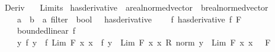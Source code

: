 %
\begin{isabellebody}%
%
%
\isadelimdocument
%
\endisadelimdocument
%
\isatagdocument
%
\isamarkuptrue%
%
\endisatagdocument
{\isafolddocument}%
%
\isadelimdocument
%
\endisadelimdocument
%
\isadelimtheory
%
\endisadelimtheory
%
\isatagtheory
{}\isamarkupfalse%
\ Deriv\isanewline
\ \ \ Limits\isanewline
{}%
\endisatagtheory
{\isafoldtheory}%
%
\isadelimtheory
%
\endisadelimtheory
%
\isadelimdocument
%
\endisadelimdocument
%
\isatagdocument
%
\isamarkuptrue%
%
\endisatagdocument
{\isafolddocument}%
%
\isadelimdocument
%
\endisadelimdocument
{}\isamarkupfalse%
\ has{\isacharunderscore}{\kern0pt}derivative\ {\isacharcolon}{\kern0pt}{\isacharcolon}{\kern0pt}\ {\isachardoublequoteopen}{\isacharparenleft}{\kern0pt}{\isacharprime}{\kern0pt}a{\isacharcolon}{\kern0pt}{\isacharcolon}{\kern0pt}real{\isacharunderscore}{\kern0pt}normed{\isacharunderscore}{\kern0pt}vector\ {\isasymRightarrow}\ {\isacharprime}{\kern0pt}b{\isacharcolon}{\kern0pt}{\isacharcolon}{\kern0pt}real{\isacharunderscore}{\kern0pt}normed{\isacharunderscore}{\kern0pt}vector{\isacharparenright}{\kern0pt}\ {\isasymRightarrow}\isanewline
\ \ \ \ {\isacharparenleft}{\kern0pt}{\isacharprime}{\kern0pt}a\ {\isasymRightarrow}\ {\isacharprime}{\kern0pt}b{\isacharparenright}{\kern0pt}\ {\isasymRightarrow}\ {\isacharprime}{\kern0pt}a\ filter\ {\isasymRightarrow}\ bool{\isachardoublequoteclose}\ \ {\isacharparenleft}{\kern0pt}\ {\isachardoublequoteopen}{\isacharparenleft}{\kern0pt}has{\isacharprime}{\kern0pt}{\isacharunderscore}{\kern0pt}derivative{\isacharparenright}{\kern0pt}{\isachardoublequoteclose}\ {}{}{\isacharparenright}{\kern0pt}\isanewline
\ \ \ {\isachardoublequoteopen}{\isacharparenleft}{\kern0pt}f\ has{\isacharunderscore}{\kern0pt}derivative\ f{\isacharprime}{\kern0pt}{\isacharparenright}{\kern0pt}\ F\ {\isasymlongleftrightarrow}\isanewline
\ \ \ \ bounded{\isacharunderscore}{\kern0pt}linear\ f{\isacharprime}{\kern0pt}\ {\isasymand}\isanewline
\ \ \ \ {\isacharparenleft}{\kern0pt}{\isacharparenleft}{\kern0pt}{\isasymlambda}y{\isachardot}{\kern0pt}\ {\isacharparenleft}{\kern0pt}{\isacharparenleft}{\kern0pt}f\ y\ {\isacharminus}{\kern0pt}\ f\ {\isacharparenleft}{\kern0pt}Lim\ F\ {\isacharparenleft}{\kern0pt}{\isasymlambda}x{\isachardot}{\kern0pt}\ x{\isacharparenright}{\kern0pt}{\isacharparenright}{\kern0pt}{\isacharparenright}{\kern0pt}\ {\isacharminus}{\kern0pt}\ f{\isacharprime}{\kern0pt}\ {\isacharparenleft}{\kern0pt}y\ {\isacharminus}{\kern0pt}\ Lim\ F\ {\isacharparenleft}{\kern0pt}{\isasymlambda}x{\isachardot}{\kern0pt}\ x{\isacharparenright}{\kern0pt}{\isacharparenright}{\kern0pt}{\isacharparenright}{\kern0pt}\ {\isacharslash}{\kern0pt}\isactrlsub R\ norm\ {\isacharparenleft}{\kern0pt}y\ {\isacharminus}{\kern0pt}\ Lim\ F\ {\isacharparenleft}{\kern0pt}{\isasymlambda}x{\isachardot}{\kern0pt}\ x{\isacharparenright}{\kern0pt}{\isacharparenright}{\kern0pt}{\isacharparenright}{\kern0pt}\ {\isasymlonglongrightarrow}\ {}{\isacharparenright}{\kern0pt}\ F{\isachardoublequoteclose}%

\end{isabellebody}
